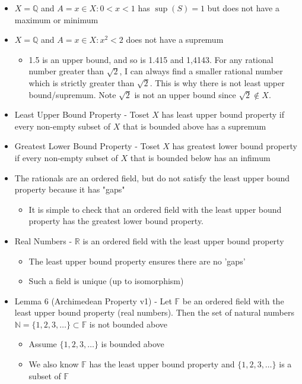 \documentclass{article}
\begin{document}
\begin{itemize}
    \item $X = \mathbb{Q}$ and $A={x \in X: 0 < x < 1}$ has $\sup(S) = 1$ but does not have a maximum or minimum
    \item $X = \mathbb{Q}$ and $A={x \in X: x^2 < 2}$ does not have a supremum
    \begin{itemize}
        \item 1.5 is an upper bound, and so is 1.415 and 1,4143. For any rational number greater than $\sqrt{2}$, I can always find a smaller rational number which is strictly greater than $\sqrt{2}$. This is why there is not least upper bound/supremum. Note $\sqrt{2}$ is not an upper bound since $\sqrt{2} \notin X$.
    \end{itemize}
    \item Least Upper Bound Property - Toset $X$ has least upper bound property if every non-empty subset of $X$ that is bounded above has a supremum
    \item Greatest Lower Bound Property - Toset $X$ has greatest lower bound property if every non-empty subset of $X$ that is bounded below has an infimum
    \item The rationals are an ordered field, but do not satisfy the least upper bound property because it has "gaps"
    \begin{itemize}
        \item It is simple to check that an ordered field with the least upper bound property has the greatest lower bound property.
    \end{itemize}
    \item Real Numbers - $\mathbb{R}$ is an ordered field with the least upper bound property
    \begin{itemize}
        \item The least upper bound property ensures there are no 'gaps'
        \item Such a field is unique (up to isomorphism)
    \end{itemize}
    \item Lemma 6 (Archimedean Property v1) - Let $\mathbb{F}$ be an ordered field with the least upper bound property (real numbers). Then the set of natural numbers $\mathbb{N} = \{1,2,3,\dots\} \subset \mathbb{F}$ is not bounded above
    \begin{itemize}
        \item Assume $\{1,2,3,\dots\}$ is bounded above
        \item We also know $\mathbb{F}$ has the least upper bound property and $\{1,2,3, \dots \}$ is a subset of $\mathbb{F}$

\end{itemize}
\end{itemize}
\end{document}
